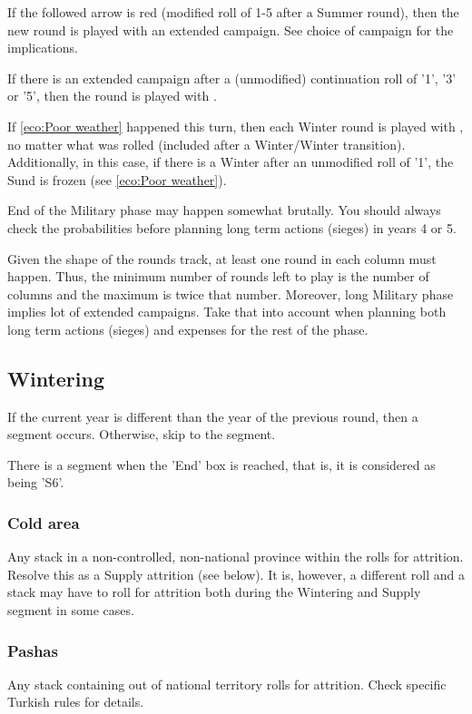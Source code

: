 If the followed arrow is red (modified roll of 1-5 after a Summer round), then
the new round is played with an extended campaign. See choice of campaign for
the implications.

If there is an extended campaign after a (unmodified) continuation roll of
'1', '3' or '5', then the round is played with .

If \ref{eco:Poor weather} happened this turn, then each Winter round is played
with , no matter what was rolled (included after a
Winter/Winter transition). Additionally, in this case, if there is a Winter
after an unmodified roll of '1', the Sund is frozen (see \ref{eco:Poor
  weather}).

\begin{playtip}
  End of the Military phase may happen somewhat brutally. You should always
  check the probabilities before planning long term actions (sieges) in years
  4 or 5.

  Given the shape of the rounds track, at least one round in each column must
  happen. Thus, the minimum number of rounds left to play is the number of
  columns and the maximum is twice that number. Moreover, long Military phase
  implies lot of extended campaigns. Take that into account when planning both
  long term actions (sieges) and expenses for the rest of the phase.
\end{playtip}

\subsection{Wintering}
If the current year is different than the year of the previous round, then a
 segment occurs. Otherwise, skip to the 
segment.

There is a  segment when the 'End' box is reached, that is,
it is considered as being 'S6'.

\subsubsection{Cold area}
Any stack in a non-controlled, non-national province within the  rolls for attrition. Resolve this as a Supply attrition (see
below). It is, however, a different roll and a stack may have to roll for
attrition both during the Wintering and Supply segment in some cases.

\subsubsection{Pashas}
Any stack containing \Timar out of \TUR national territory rolls for
attrition. Check specific Turkish rules for details.

